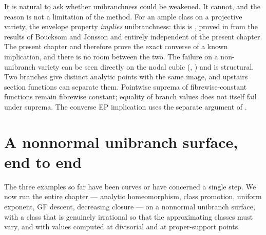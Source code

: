 \begin{remark}
\label{rem:ch43-unibranch-sharp}
It is natural to ask whether unibranchness could be weakened.  It cannot,
and the reason is not a limitation of the method.  For an ample class on a
projective variety, the envelope property \emph{implies} unibranchness: this
is , proved in
 from the results of Boucksom and Jonsson and
entirely independent of the present chapter.  The present chapter and
 therefore prove the exact converse
of a known implication, and there is no room between the two.  The failure
on a non-unibranch variety can be seen directly on the nodal cubic
(, ) and is
structural.  Two branches give distinct analytic points with the same
image, and upstairs section functions can separate them.
Pointwise suprema of fibrewise-constant functions remain fibrewise
constant; equality of branch values does not itself fail under suprema.
The converse EP implication uses the separate argument of
.
\end{remark}

\section{A nonnormal unibranch surface, end to end}
\label{sec:ch43-computations}

The three examples so far have been curves or have concerned a single step.
We now run the entire chapter --- analytic homeomorphism, class promotion,
uniform exponent, GF descent, decreasing closure --- on a nonnormal
unibranch surface, with a class that is genuinely irrational so that the
approximating classes must vary, and with values computed at divisorial and
at proper-support points.

